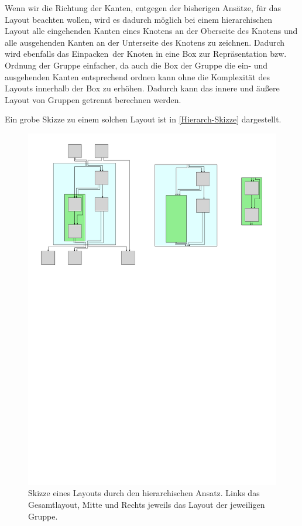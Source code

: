 Wenn wir die Richtung der Kanten, entgegen der bisherigen Ansätze, für das Layout beachten wollen, wird es dadurch möglich bei einem hierarchischen Layout alle eingehenden Kanten eines Knotens an der Oberseite des Knotens und alle ausgehenden Kanten an der Unterseite des Knotens zu zeichnen. 
Dadurch wird ebenfalls das \glqq Einpacken\grqq\ der Knoten in eine Box zur Repräsentation bzw. Ordnung der Gruppe einfacher, da auch die Box der Gruppe die ein- und ausgehenden Kanten entsprechend ordnen kann ohne die Komplexität des Layouts innerhalb der Box zu erhöhen. Dadurch kann das innere und äußere Layout von Gruppen getrennt berechnen werden.

Ein grobe Skizze zu einem solchen Layout ist in \autoref{Hierarch-Skizze} dargestellt.

\begin{figure}[h!]
\begin{center}
	\includegraphics[width=\textwidth]{Pics/hierarchisch.pdf}
	\caption{Skizze eines Layouts durch den hierarchischen Ansatz. Links das Gesamtlayout, Mitte und Rechts jeweils das Layout der jeweiligen Gruppe.}
	\label{Hierarch-Skizze}
\end{center}
\end{figure}

